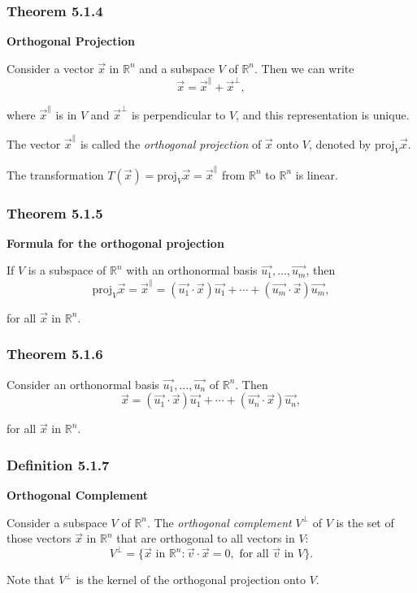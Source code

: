 \documentclass{report}
\begin{document}
\subsubsection*{Theorem 5.1.4}
\par\noindent\textbf{Orthogonal Projection}
\par\noindent Consider a vector $\vec{x}$ in $\mathbb{R}^{n}$ and a subspace $V$ of $\mathbb{R}^{n}$. Then we can write
\[\vec{x}=\vec{x}^{\parallel}+\vec{x}^{\perp},\]
\par\noindent where $\vec{x}^{\parallel}$ is in $V$ and $\vec{x}^{\perp}$ is perpendicular to $V$, and this representation is unique.
\par\noindent The vector $\vec{x}^{\parallel}$ is called the \textit{orthogonal projection} of $\vec{x}$ onto $V$, denoted by $\textrm{proj}_{V}\vec{x}$.
\par\noindent The transformation $T(\vec{x})=\textrm{proj}_{V}\vec{x}=\vec{x}^{\parallel}$ from $\mathbb{R}^{n}$ to $\mathbb{R}^{n}$ is linear.
\subsubsection*{Theorem 5.1.5}
\par\noindent\textbf{Formula for the orthogonal projection}
\par\noindent If $V$ is a subspace of $\mathbb{R}^{n}$ with an orthonormal basis $\vec{u_{1}},\ldots{},\vec{u_{m}}$, then
\[\textrm{proj}_{V}\vec{x}=\vec{x}^{\parallel}=(\vec{u_{1}}\cdot{}\vec{x})\vec{u_{1}}+\cdots{}+(\vec{u_{m}}\cdot{}\vec{x})\vec{u_{m}},\]
\par\noindent for all $\vec{x}$ in $\mathbb{R}^{n}$.
\subsubsection*{Theorem 5.1.6}
\par\noindent Consider an orthonormal basis $\vec{u_{1}},\ldots{},\vec{u_{n}}$ of $\mathbb{R}^{n}$. Then
\[\vec{x}=(\vec{u_{1}}\cdot{}\vec{x})\vec{u_{1}}+\cdots{}+(\vec{u_{n}}\cdot{}\vec{x})\vec{u_{n}},\]
\par\noindent for all $\vec{x}$ in $\mathbb{R}^{n}$.
\subsubsection*{Definition 5.1.7}
\par\noindent\textbf{Orthogonal Complement}
\par\noindent Consider a subspace $V$ of $\mathbb{R}^{n}$. The \textit{orthogonal complement} $V^{\perp}$ of $V$ is the set of those vectors $\vec{x}$ in $\mathbb{R}^{n}$ that are orthogonal to all vectors in $V$:
\[V^{\perp}=\{\vec{x}\textrm{ in }\mathbb{R}^{n}:\vec{v}\cdot{}\vec{x}=0,\textrm{ for all }\vec{v}\textrm{ in }V\}.\]
\par\noindent Note that $V^{\perp}$ is the kernel of the orthogonal projection onto $V$.
\end{document}

